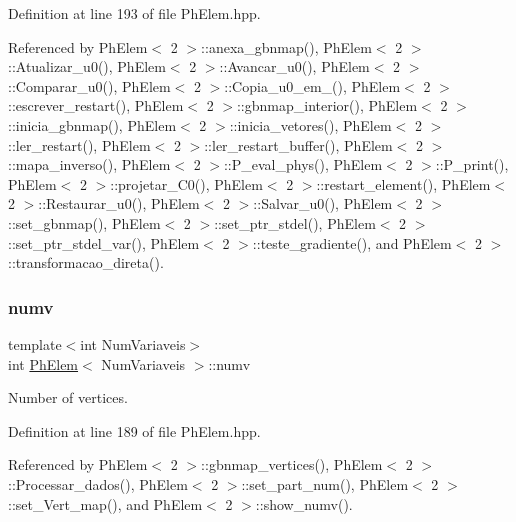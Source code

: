 Definition at line 193 of file Ph\+Elem.\+hpp.



Referenced by Ph\+Elem$<$ 2 $>$\+::anexa\+\_\+gbnmap(), Ph\+Elem$<$ 2 $>$\+::\+Atualizar\+\_\+u0(), Ph\+Elem$<$ 2 $>$\+::\+Avancar\+\_\+u0(), Ph\+Elem$<$ 2 $>$\+::\+Comparar\+\_\+u0(), Ph\+Elem$<$ 2 $>$\+::\+Copia\+\_\+u0\+\_\+em\+\_\+(), Ph\+Elem$<$ 2 $>$\+::escrever\+\_\+restart(), Ph\+Elem$<$ 2 $>$\+::gbnmap\+\_\+interior(), Ph\+Elem$<$ 2 $>$\+::inicia\+\_\+gbnmap(), Ph\+Elem$<$ 2 $>$\+::inicia\+\_\+vetores(), Ph\+Elem$<$ 2 $>$\+::ler\+\_\+restart(), Ph\+Elem$<$ 2 $>$\+::ler\+\_\+restart\+\_\+buffer(), Ph\+Elem$<$ 2 $>$\+::mapa\+\_\+inverso(), Ph\+Elem$<$ 2 $>$\+::\+P\+\_\+eval\+\_\+phys(), Ph\+Elem$<$ 2 $>$\+::\+P\+\_\+print(), Ph\+Elem$<$ 2 $>$\+::projetar\+\_\+\+C0(), Ph\+Elem$<$ 2 $>$\+::restart\+\_\+element(), Ph\+Elem$<$ 2 $>$\+::\+Restaurar\+\_\+u0(), Ph\+Elem$<$ 2 $>$\+::\+Salvar\+\_\+u0(), Ph\+Elem$<$ 2 $>$\+::set\+\_\+gbnmap(), Ph\+Elem$<$ 2 $>$\+::set\+\_\+ptr\+\_\+stdel(), Ph\+Elem$<$ 2 $>$\+::set\+\_\+ptr\+\_\+stdel\+\_\+var(), Ph\+Elem$<$ 2 $>$\+::teste\+\_\+gradiente(), and Ph\+Elem$<$ 2 $>$\+::transformacao\+\_\+direta().

\mbox{\label{classPhElem_a67ed36925b04bf0f2d177c8d31737526}} 
\subsubsection{\texorpdfstring{numv}{numv}}
{\footnotesize\ttfamily template$<$int Num\+Variaveis$>$ \\
int \hyperlink{classPhElem}{Ph\+Elem}$<$ Num\+Variaveis $>$\+::numv\hspace{0.3cm}{\ttfamily [protected]}}



Number of vertices. 



Definition at line 189 of file Ph\+Elem.\+hpp.



Referenced by Ph\+Elem$<$ 2 $>$\+::gbnmap\+\_\+vertices(), Ph\+Elem$<$ 2 $>$\+::\+Processar\+\_\+dados(), Ph\+Elem$<$ 2 $>$\+::set\+\_\+part\+\_\+num(), Ph\+Elem$<$ 2 $>$\+::set\+\_\+\+Vert\+\_\+map(), and Ph\+Elem$<$ 2 $>$\+::show\+\_\+numv().

\mbox{\label{classPhElem_a141616ccadb4a17328626befc4330932}} 

